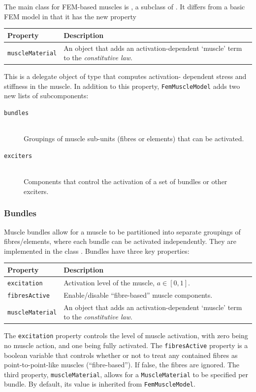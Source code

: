 The main class for FEM-based muscles is 
, a subclass 
of .  It differs from a basic
FEM model in that it has the new property
\begin{center}
	\begin{tabular}{|ll|}
		\hline
		Property & Description\\
		\hline
		{\tt muscleMaterial} & An object that adds an activation-dependent
		                       `muscle' term to the \emph{constitutive law}.\\
		\hline
	\end{tabular}
\end{center}
This is a delegate object of type 
 that computes activation-%
dependent stress and stiffness in the muscle. In addition to this property, 
{\tt FemMuscleModel} adds two new lists of subcomponents:
\begin{description}
   \item[{\tt bundles}]\mbox{}\\
   Groupings of muscle sub-units (fibres or elements) that can be activated.

   \item[{\tt exciters}]\mbox{}\\
   Components that control the activation of a set of bundles or other exciters.
\end{description}

\subsubsection{Bundles}
\ifLaTeXML{\newline}

Muscle bundles allow for a muscle to be partitioned into separate groupings
of fibres/elements, where each bundle can be activated independently.  They 
are implemented in the class .
Bundles have three key properties:
\begin{center}
	\begin{tabular}{|ll|}
		\hline
		Property & Description\\
		\hline
		{\tt excitation} & Activation level of the muscle,  $a\in[0, 1]$.\\
		{\tt fibresActive} & Enable/disable ``fibre-based'' muscle components.\\
		{\tt muscleMaterial} & An object that adds an activation-dependent
		                       `muscle' term to the \emph{constitutive law}.\\
		\hline
	\end{tabular}
\end{center}
The {\tt excitation} property controls the level of muscle activation, with zero 
being no muscle action, and one being fully activated.  The {\tt fibresActive} 
property is a boolean variable that controls whether or not to treat any 
contained fibres as point-to-point-like muscles (``fibre-based'').  If false, 
the fibres are ignored.  The third property, {\tt muscleMaterial}, allows for a 
{\tt MuscleMaterial} to be specified per bundle.  By default, its value is 
inherited from {\tt FemMuscleModel}.

